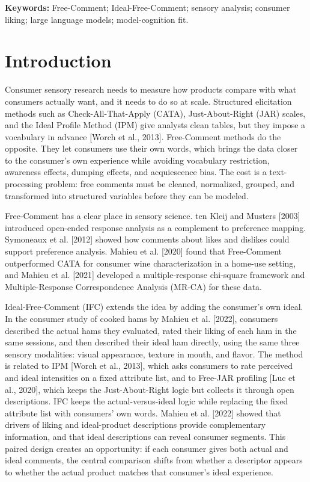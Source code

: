 \documentclass[11pt]{article}
\begin{document}
\noindent\textbf{Keywords:} Free-Comment; Ideal-Free-Comment; sensory analysis;
consumer liking; large language models; model-cognition fit.

\section{Introduction}
\label{sec:intro}

Consumer sensory research needs to measure how products compare with what
consumers actually want, and it needs to do so at scale. Structured elicitation
methods such as Check-All-That-Apply (CATA), Just-About-Right (JAR) scales, and
the Ideal Profile Method (IPM) give analysts clean tables, but they impose a
vocabulary in advance [Worch et al., 2013]. Free-Comment methods do the
opposite. They let consumers use their own words, which brings the data closer
to the consumer's own experience while avoiding vocabulary restriction,
awareness effects, dumping effects, and acquiescence bias. The cost is a
text-processing problem: free comments must be cleaned, normalized, grouped,
and transformed into structured variables before they can be modeled.

Free-Comment has a clear place in sensory science. ten Kleij and Musters [2003]
introduced open-ended response analysis as a complement to preference mapping.
Symoneaux et al. [2012] showed how comments about likes and dislikes could
support preference analysis. Mahieu et al. [2020] found that Free-Comment
outperformed CATA for consumer wine characterization in a home-use setting, and
Mahieu et al. [2021] developed a multiple-response chi-square framework and
Multiple-Response Correspondence Analysis (MR-CA) for these data.

Ideal-Free-Comment (IFC) extends the idea by adding the consumer's own ideal.
In the consumer study of cooked hams by Mahieu et al. [2022], consumers
described the actual hams they evaluated, rated their liking of each ham in the
same sessions, and then described their ideal ham directly, using the same
three sensory modalities: visual appearance, texture in mouth, and flavor. The
method is related to IPM [Worch et al., 2013], which asks consumers to rate
perceived and ideal intensities on a fixed attribute list, and to Free-JAR
profiling [Luc et al., 2020], which keeps the Just-About-Right logic but
collects it through open descriptions. IFC keeps the actual-versus-ideal logic
while replacing the fixed attribute list with consumers' own words. Mahieu et
al. [2022] showed that drivers of liking and ideal-product descriptions provide
complementary information, and that ideal descriptions can reveal consumer
segments. This paired design creates an opportunity: if each consumer gives
both actual and ideal comments, the central comparison shifts from whether a
descriptor appears to whether the actual product matches that consumer's ideal
experience.
\end{document}
